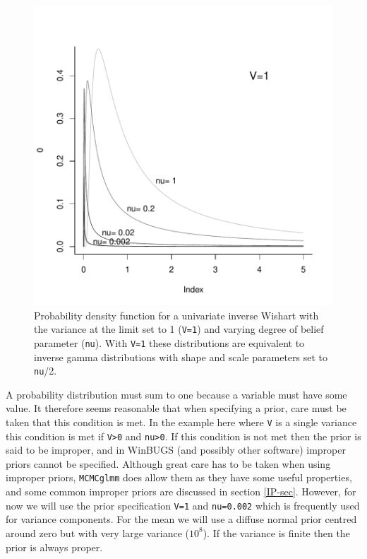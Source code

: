 \documentclass{article}
\begin{document}
\begin{figure}[!h]
\begin{center}
\includegraphics{Lecture1-027}
\end{center}
\caption{Probability density function for a univariate inverse Wishart with the variance at the limit set to 1 (\texttt{V=1}) and varying degree of belief parameter (\texttt{nu}). With \texttt{V=1} these distributions are equivalent to inverse gamma distributions with shape and scale parameters set to \texttt{nu}/2.}
\label{dinvgamma-fig}
\end{figure}

A probability distribution must sum to one because a variable must have some value. It therefore seems reasonable that when specifying a prior, care must be taken that this condition is met. In the example here where \texttt{V} is a single variance this condition is met if \texttt{V>0} and \texttt{nu>0}.  If this condition is not met then the prior is said to be improper, and in WinBUGS (and possibly other software) improper priors cannot be specified.  Although great care has to be taken when using improper priors, \texttt{MCMCglmm} does allow them as they have some useful properties, and some common improper priors are discussed in section \ref{IP-sec}. However, for now we will use the prior specification \texttt{V=1} and \texttt{nu=0.002} which is frequently used for variance components. For the mean we will use a diffuse normal prior centred around zero but with very large variance ($10^{8}$). If the variance is finite then the prior is always proper.\\
\end{document}
